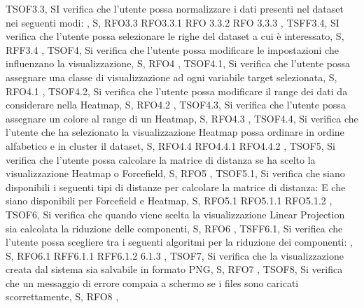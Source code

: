 {{        TSOF3.3,
        SI verifica che l'utente possa normalizzare i dati presenti nel dataset nei seguenti modi:
        ,
        S,
        RFO3.3 RFO3.3.1 RFO 3.3.2 RFO 3.3.3
    },
    {   
        TSFF3.4,
        SI verifica che l'utente possa selezionare le righe del dataset a cui è interessato,
        S,
        RFF3.4
    },
    {   
        TSOF4,
        Si verifica che l'utente possa modificare le impostazioni che influenzano la visualizzazione,
        S,
        RFO4
    },
    {   
        TSOF4.1,
        Si verifica che l'utente possa assegnare una classe di visualizzazione ad ogni variabile target selezionata,
        S,
        RFO4.1
    },
    {   
        TSOF4.2,
        Si verifica che l'utente possa modificare il range dei dati da considerare nella Heatmap,
        S,
        RFO4.2
    },
    {   
        TSOF4.3,
        Si verifica che l'utente possa assegnare un colore al range di un Heatmap,
        S,
        RFO4.3
    },
    {   
        TSOF4.4,
        Si verifica che l'utente che ha selezionato la visualizzazione Heatmap possa ordinare in ordine alfabetico e in cluster il dataset,
        S,
        RFO4.4 RFO4.4.1 RFO4.4.2
    },
    {   
        TSOF5,
        Si verifica che l'utente possa calcolare la matrice di distanza se ha scelto la visualizzazione Heatmap o Forcefield,
        S,
        RFO5
    },    
    {   
        TSOF5.1,
        Si verifica che siano disponibili i seguenti tipi di distanze per calcolare la matrice di distanza:
        E che siano disponibili per Forcefield e Heatmap,
        S,
        RFO5.1 RFO5.1.1 RFO5.1.2
    },
    {   
        TSOF6,
        Si verifica che quando viene scelta la visualizzazione Linear Projection sia calcolata la riduzione delle componenti,
        S,
        RFO6
    },
    {   
        TSFF6.1,
        Si verifica che l'utente possa scegliere tra i seguenti algoritmi per la riduzione dei componenti:
        ,
        S,
        RFO6.1 RFF6.1.1 RFF6.1.2 6.1.3
    },
    {   
        TSOF7,
        Si verifica che la visualizzazione creata dal sistema sia salvabile in formato PNG,
        S,
        RFO7
    },
    {   
        TSOF8,
        Si verifica che un messaggio di errore compaia a schermo se i files sono caricati scorrettamente,
        S,
        RFO8
    },
    }
    
    
